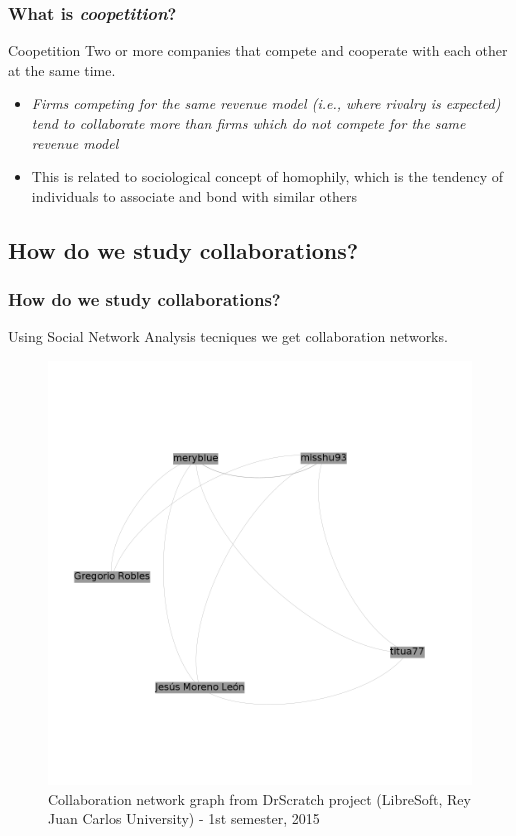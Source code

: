 \documentclass{beamer}
\begin{document}
\begin{frame}
\frametitle{What is \textit{coopetition}?}
\begin{block}{Coopetition}
Two or more companies that compete and cooperate with each other at the same time.
\end{block}
\begin{itemize}
\item \textit{Firms competing for the same revenue model (i.e., where rivalry is
expected) tend to collaborate more than firms which do not compete for the same
revenue model}
\item This is related to sociological concept of homophily, which is the tendency of individuals to associate and bond with similar others
\end{itemize}

\end{frame}


\subsection{How do we study collaborations?}

\begin{frame}
\frametitle{How do we study collaborations?}
Using Social Network Analysis tecniques we get collaboration networks.
\begin{figure}
\includegraphics[scale=0.16]{example-graph1.png}
\caption{Collaboration network graph from DrScratch project 
(LibreSoft, Rey Juan Carlos University) - 1st semester, 2015}
\end{figure}
\end{frame}
\end{document}
